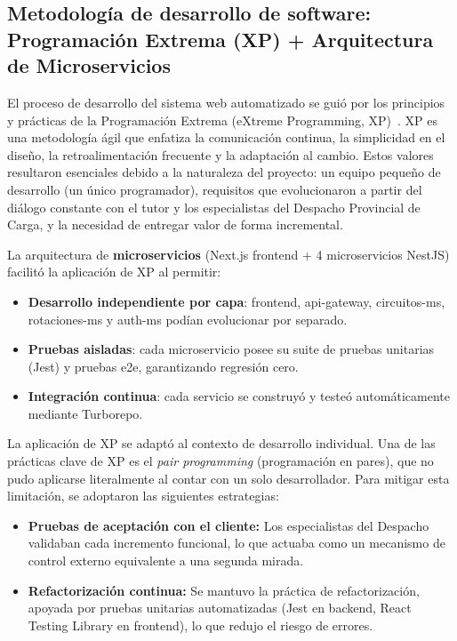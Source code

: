 \subsection{Metodología de desarrollo de software: Programación Extrema (XP) + Arquitectura de Microservicios}
El proceso de desarrollo del sistema web automatizado se guió por los principios y prácticas de la Programación Extrema (eXtreme Programming, XP)~\citep{beck2000}. XP es una metodología ágil que enfatiza la comunicación continua, la simplicidad en el diseño, la retroalimentación frecuente y la adaptación al cambio. Estos valores resultaron esenciales debido a la naturaleza del proyecto: un equipo pequeño de desarrollo (un único programador), requisitos que evolucionaron a partir del diálogo constante con el tutor y los especialistas del Despacho Provincial de Carga, y la necesidad de entregar valor de forma incremental.

La arquitectura de \textbf{microservicios} (Next.js frontend + 4 microservicios NestJS) facilitó la aplicación de XP al permitir:
\begin{itemize}
    \item \textbf{Desarrollo independiente por capa}: frontend, api-gateway, circuitos-ms, rotaciones-ms y auth-ms podían evolucionar por separado.
    \item \textbf{Pruebas aisladas}: cada microservicio posee su suite de pruebas unitarias (Jest) y pruebas e2e, garantizando regresión cero.
    \item \textbf{Integración continua}: cada servicio se construyó y testeó automáticamente mediante Turborepo.
\end{itemize}

La aplicación de XP se adaptó al contexto de desarrollo individual. Una de las prácticas clave de XP es el \textit{pair programming} (programación en pares), que no pudo aplicarse literalmente al contar con un solo desarrollador. Para mitigar esta limitación, se adoptaron las siguientes estrategias:
\begin{itemize}
    \item \textbf{Pruebas de aceptación con el cliente:} Los especialistas del Despacho validaban cada incremento funcional, lo que actuaba como un mecanismo de control externo equivalente a una segunda mirada.
    \item \textbf{Refactorización continua:} Se mantuvo la práctica de refactorización, apoyada por pruebas unitarias automatizadas (Jest en backend, React Testing Library en frontend), lo que redujo el riesgo de errores.
\end{itemize}

